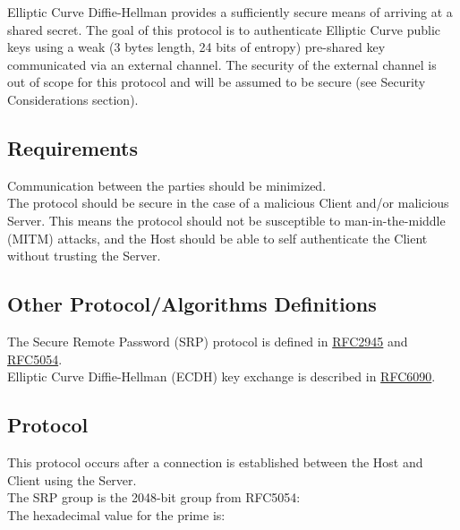 \documentclass{article}
\begin{document}
    Elliptic Curve Diffie-Hellman provides a sufficiently secure means of arriving
    at a shared secret. The goal of this protocol is to authenticate Elliptic Curve public keys
    using a weak (3 bytes length, 24 bits of entropy) pre-shared key communicated
    via an external channel. The security of the external channel is out of scope
    for this protocol and will be assumed to be secure (see Security Considerations
    section).\\

    \subsection{Requirements}

    Communication between the parties should be minimized.\\

    The protocol should be secure in the case of a malicious Client and/or malicious
    Server. This means the protocol should not be susceptible to man-in-the-middle
    (MITM) attacks, and the Host should be able to self authenticate the Client
    without trusting the Server.\\

    \subsection{Other Protocol/Algorithms Definitions}

    The Secure Remote Password (SRP) protocol is defined in
    \href{(https://datatracker.ietf.org/doc/html/rfc2945}{RFC2945} and
    \href{https://datatracker.ietf.org/doc/html/rfc5054}{RFC5054}.\\

    Elliptic Curve Diffie-Hellman (ECDH) key exchange is described in
    \href{https://datatracker.ietf.org/doc/html/rfc60904}{RFC6090}.\\

    \subsection{Protocol}

    This protocol occurs after a connection is established between the Host and
    Client using the Server.\\

    The SRP group is the 2048-bit group from RFC5054:\\

    The hexadecimal value for the prime is:\\
\end{document}
